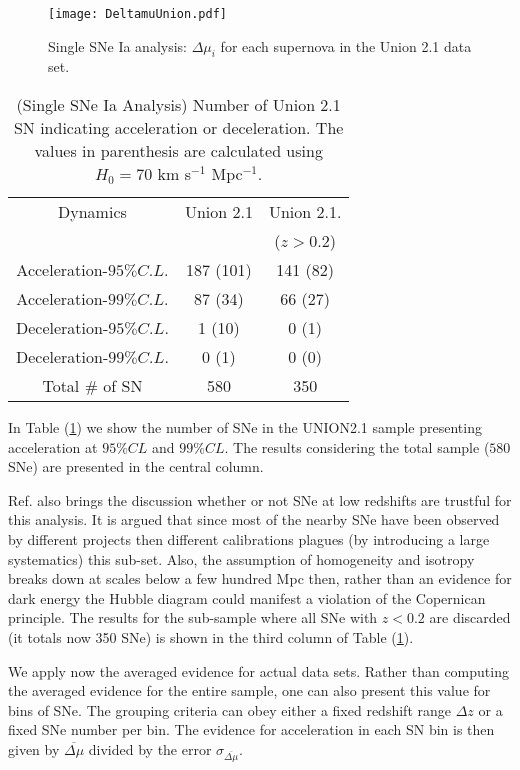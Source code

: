 \documentclass[nofootinbib,twocolumn]{revtex4}
\begin{document}
\begin{figure}
\texttt{[image: DeltamuUnion.pdf]}
\caption{Single SNe Ia analysis: $\Delta \mu_i$ for each supernova in the Union 2.1 data set.}
\label{FigSingle}
\end{figure}



\begin{table}
\centering\caption{(Single SNe Ia Analysis) Number of Union 2.1 SN indicating acceleration or deceleration. The values in parenthesis are calculated using $H_0=70$ km s$^{-1}$ Mpc$^{-1}$.}
{\begin{tabular} {c||c||c}
Dynamics & Union 2.1 & Union 2.1. \\
 &  & ($z>0.2$) \\
\hline \hline 
Acceleration-$95 \% C.L.$ & 187 (101) & 141 (82)  \\
Acceleration-$99 \% C.L.$ & 87 (34) & 66 (27)  \\
Deceleration-$95 \% C.L.$ & 1 (10) & 0 (1)  \\
Deceleration-$99 \% C.L.$ & 0 (1) & 0 (0)  \\
Total \# of SN & 580 & 350  \\
\hline
\end{tabular}} 
\label{TableSingleUNION}
\end{table}


In Table (\ref{TableSingleUNION}) we show the number of SNe in the UNION2.1 sample presenting acceleration at $95\% CL$ and $99\% CL$. The results considering the total sample ($580$ SNe) are presented in the central column.

Ref. \cite{Seikel:2008ms} also brings the discussion whether or not SNe at low redshifts are trustful for this analysis. It is argued that since most of the nearby SNe have been observed by different projects then different calibrations plagues (by introducing a large systematics) this sub-set. Also, the assumption of homogeneity and isotropy breaks down at scales below a few hundred Mpc then, rather than an evidence for dark energy the Hubble diagram could manifest a violation of the Copernican principle. The results for the sub-sample where all SNe with $z<0.2$ are discarded (it totals now 350 SNe) is shown in the third column of Table (\ref{TableSingleUNION}). 


We apply now the averaged evidence for actual data sets. Rather than computing the averaged evidence for the entire sample, one can also present this value for bins of SNe. The grouping criteria can obey either a fixed redshift range $\Delta z$ or a fixed SNe number per bin. The evidence for acceleration in each SN bin is then given by $\overline{\Delta\mu}$ divided by the error $\sigma_{\overline{\Delta\mu}}$.
\end{document}
